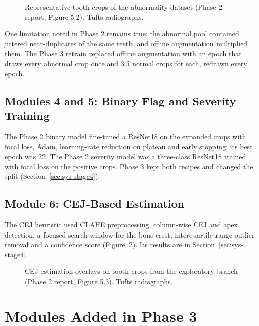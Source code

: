\begin{figure}[!htbp]
\centering
{}
\caption[Representative tooth crops of the abnormality dataset]{Representative tooth crops of the
abnormality dataset (Phase 2 report, Figure 5.2). Tufts radiographs.}
\label{fig:p2samples}
\end{figure}

One limitation noted in Phase 2 remains true: the abnormal pool contained jittered near-duplicates of
the same teeth, and offline augmentation multiplied them. The Phase 3 retrain replaced offline
augmentation with an epoch that draws every abnormal crop once and 3.5 normal crops for each, redrawn
every epoch.

\subsection{Modules 4 and 5: Binary Flag and Severity Training}

The Phase 2 binary model fine-tuned a ResNet18 on the expanded crops with focal loss, Adam,
learning-rate reduction on plateau and early stopping; its best epoch was 22. The Phase 2 severity
model was a three-class ResNet18 trained with focal loss on the positive crops. Phase 3 kept both
recipes and changed the split (Section~\ref{sec:sys-stage4}). %

\subsection{Module 6: CEJ-Based Estimation}

The CEJ heuristic used CLAHE preprocessing, column-wise CEJ and apex detection, a focused search window
for the bone crest, interquartile-range outlier removal and a confidence score
(Figure~\ref{fig:p2cej}). Its results are in Section~\ref{sec:sys-stage4}. %

\begin{figure}[!htbp]
\centering
{}
\caption[CEJ-estimation overlays on tooth crops]{CEJ-estimation overlays on tooth crops from the
exploratory branch (Phase 2 report, Figure 5.3). Tufts radiographs.}
\label{fig:p2cej}
\end{figure}

\section{Modules Added in Phase 3}

